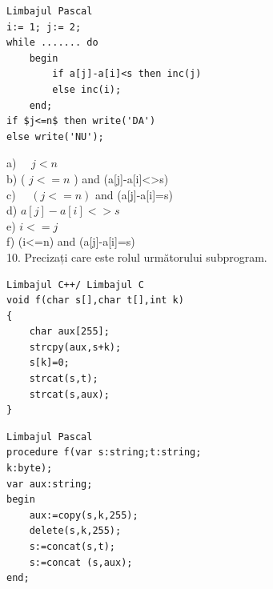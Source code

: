 \documentclass[10pt]{article}
\begin{document}
\begin{verbatim}
Limbajul Pascal
i:= 1; j:= 2;
while ....... do
    begin
        if a[j]-a[i]<s then inc(j)
        else inc(i);
    end;
if $j<=n$ then write('DA')
else write('NU');
\end{verbatim}

a) $\quad j<n$\\
b) ( $j<=n$ ) and (a[j]-a[i]<>s)\\
c) $\quad(j<=n)$ and (a[j]-a[i]=s)\\
d) $a[j]-a[i]<>s$\\
e) $i<=j$\\[0pt]
f) (i<=n) and (a[j]-a[i]=s)\\
10. Precizați care este rolul următorului subprogram.

\begin{verbatim}
Limbajul C++/ Limbajul C
void f(char s[],char t[],int k)
{
    char aux[255];
    strcpy(aux,s+k);
    s[k]=0;
    strcat(s,t);
    strcat(s,aux);
}
\end{verbatim}

\begin{verbatim}
Limbajul Pascal
procedure f(var s:string;t:string;
k:byte);
var aux:string;
begin
    aux:=copy(s,k,255);
    delete(s,k,255);
    s:=concat(s,t);
    s:=concat (s,aux);
end;
\end{verbatim}
\end{document}
